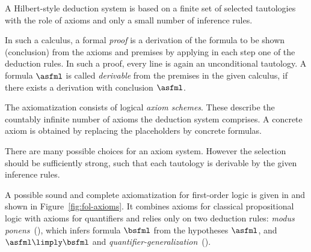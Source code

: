                 A Hilbert-style deduction system is based on a finite set of selected tautologies with the role of axioms and only a small number of inference rules.

                In such a calculus, a formal \emph{proof} is a derivation of the formula to be shown (conclusion) from the axioms and premises by applying in each step one of the deduction rules.
                In such a proof, every line is again an unconditional tautology.
                A formula $\asfml$ is called \emph{derivable} from the premises in the given calculus, if there exists a derivation with conclusion $\asfml$.

                The axiomatization consists of logical \emph{axiom schemes}. These describe the countably infinite number of axioms the deduction system comprises. A concrete axiom is obtained by replacing the placeholders by concrete formulas.

                There are many possible choices for an axiom system. However the selection should be sufficiently strong, such that each tautology is derivable by the given inference rules.

                A possible sound and complete axiomatization for first-order logic is given in \cite{Bimbo14ProofTheory} and shown in Figure~\ref{fig:fol-axioms}.                
                It combines axioms for classical propositional logic with axioms for quantifiers and relies only on two deduction rules: \emph{modus ponens}~(), which infers formula $\bsfml$ from the hypotheses $\asfml$, and $\asfml\limply\bsfml$ and \emph{quantifier-generalization}~().
                



